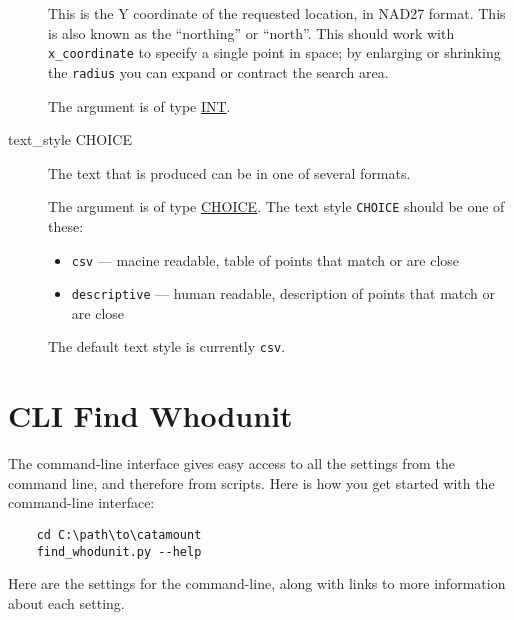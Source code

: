 \begin{description}
This is the Y coordinate of the requested location, in NAD27 format.
This is also known as the ``northing'' or ``north''. This should work
with \verb=x_coordinate= to specify a single point in space; by
enlarging or shrinking the \verb=radius= you can expand or contract
the search area.

The argument is of type \hyperlink{argument-type-int}{INT}.

\item[text\_style CHOICE]
\hypertarget{whodunit-text-style}{}

The text that is produced can be in one of several formats.

The argument is of type \hyperlink{argument-type-choice}{CHOICE}. The text
style \verb=CHOICE= should be one of these:

\begin{itemize}
\item \verb=csv= --- macine readable, table of points that match or are close
\item \verb=descriptive= --- human readable, description of points that match or are close
\end{itemize}

The default text style is currently \verb=csv=.

\end{description}


\section{CLI Find Whodunit}

The command-line interface gives easy access to all the settings from the
command line, and therefore from scripts. Here is how you get started with
the command-line interface:

\begin{verbatim}
    cd C:\path\to\catamount
    find_whodunit.py --help
\end{verbatim}

Here are the settings for the command-line, along with links to
more information about each setting.

